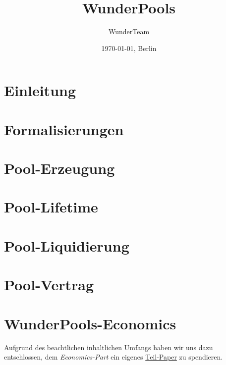 \documentclass[11pt]{scrartcl}
\title{WunderPools}
\author{WunderTeam}
\date{\today{}, Berlin}
\begin{document}
\maketitle
\tableofcontents{}

\newpage



\section{Einleitung}
\label{sec:pools-einleitung}
\vspace{0.3cm}


\section{Formalisierungen}
\vspace{0.3cm}


\section{Pool-Erzeugung}
\vspace{0.3cm}


\section{Pool-Lifetime}
\vspace{0.3cm}


\section{Pool-Liquidierung}
\label{sec:pools-liquidierung}
\vspace{0.3cm}


\section{Pool-Vertrag}
\label{sec:pools-vertrag}
\vspace{0.3cm}


\section{WunderPools-Economics}
\vspace{0.3cm}

Aufgrund des beachtlichen inhaltlichen Umfangs haben wir uns dazu entschlossen, dem \textit{Economics-Part} ein eigenes \href{https://github.com/WunderPass/White-Paper/blob/main/pools-economics.pdf}{Teil-Paper} zu spendieren.
\end{document}
